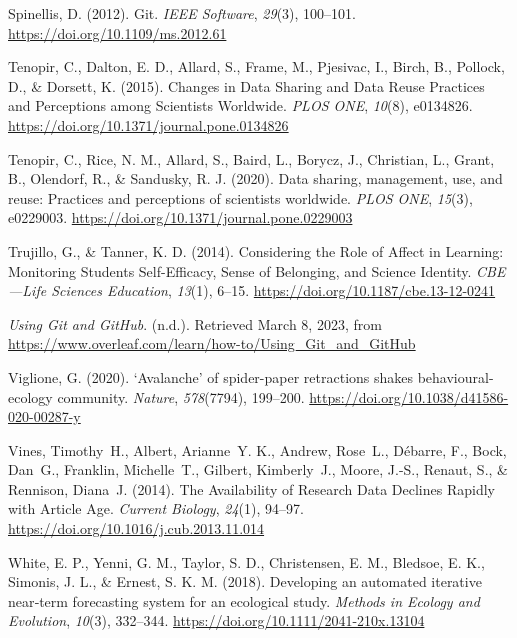 \begin{CSLReferences}{1}{0}
\leavevmode{}%
Spinellis, D. (2012). Git. \emph{IEEE Software}, \emph{29}(3), 100--101. \url{https://doi.org/10.1109/ms.2012.61}

\leavevmode{}%
Tenopir, C., Dalton, E. D., Allard, S., Frame, M., Pjesivac, I., Birch, B., Pollock, D., \& Dorsett, K. (2015). Changes in Data Sharing and Data Reuse Practices and Perceptions among Scientists Worldwide. \emph{PLOS ONE}, \emph{10}(8), e0134826. \url{https://doi.org/10.1371/journal.pone.0134826}

\leavevmode{}%
Tenopir, C., Rice, N. M., Allard, S., Baird, L., Borycz, J., Christian, L., Grant, B., Olendorf, R., \& Sandusky, R. J. (2020). Data sharing, management, use, and reuse: Practices and perceptions of scientists worldwide. \emph{PLOS ONE}, \emph{15}(3), e0229003. \url{https://doi.org/10.1371/journal.pone.0229003}

\leavevmode{}%
Trujillo, G., \& Tanner, K. D. (2014). Considering the Role of Affect in Learning: Monitoring Students\textquotesingle{} Self-Efficacy, Sense of Belonging, and Science Identity. \emph{CBE---Life Sciences Education}, \emph{13}(1), 6--15. \url{https://doi.org/10.1187/cbe.13-12-0241}

\leavevmode{}%
\emph{Using Git and GitHub}. (n.d.). Retrieved March 8, 2023, from \url{https://www.overleaf.com/learn/how-to/Using_Git_and_GitHub}

\leavevmode{}%
Viglione, G. (2020). `Avalanche' of spider-paper retractions shakes behavioural-ecology community. \emph{Nature}, \emph{578}(7794), 199--200. \url{https://doi.org/10.1038/d41586-020-00287-y}

\leavevmode{}%
Vines, Timothy~H., Albert, Arianne~Y. K., Andrew, Rose~L., Débarre, F., Bock, Dan~G., Franklin, Michelle~T., Gilbert, Kimberly~J., Moore, J.-S., Renaut, S., \& Rennison, Diana~J. (2014). The Availability of Research Data Declines Rapidly with Article Age. \emph{Current Biology}, \emph{24}(1), 94--97. \url{https://doi.org/10.1016/j.cub.2013.11.014}

\leavevmode{}%
White, E. P., Yenni, G. M., Taylor, S. D., Christensen, E. M., Bledsoe, E. K., Simonis, J. L., \& Ernest, S. K. M. (2018). Developing an automated iterative near‐term forecasting system for an ecological study. \emph{Methods in Ecology and Evolution}, \emph{10}(3), 332--344. \url{https://doi.org/10.1111/2041-210x.13104}


\end{CSLReferences}
